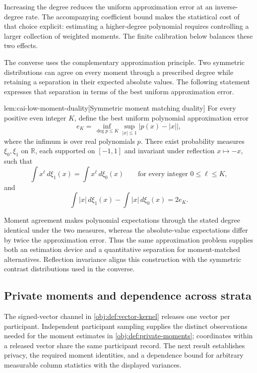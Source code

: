 \documentclass[11pt]{article}
\begin{document}
Increasing the degree reduces the uniform approximation error at an inverse-degree rate. The accompanying coefficient bound makes the statistical cost of that choice explicit: estimating a higher-degree polynomial requires controlling a larger collection of weighted moments. The finite calibration below balances these two effects.

The converse uses the complementary approximation principle. Two symmetric distributions can agree on every moment through a prescribed degree while retaining a separation in their expected absolute values. The following statement expresses that separation in terms of the best uniform approximation error.

\begin{theoremv}{lem:cai-low-moment-duality}[Symmetric moment matching duality]
For every positive even integer \(K\), define the best uniform polynomial approximation error
\[
e_K=\inf_{\deg p\le K}\sup_{|x|\le 1}\bigl|p(x)-|x|\bigr|,
\]
where the infimum is over real polynomials \(p\). There exist probability measures \(\xi_0,\xi_1\) on \(\mathbb R\), each supported on \([-1,1]\) and invariant under reflection \(x\mapsto -x\), such that
\[
\int x^\ell\,d\xi_1(x)=\int x^\ell\,d\xi_0(x)
\qquad\text{for every integer }0\le \ell\le K,
\]
and
\[
\int |x|\,d\xi_1(x)-\int |x|\,d\xi_0(x)=2e_K.
\]
\end{theoremv}

Moment agreement makes polynomial expectations through the stated degree identical under the two measures, whereas the absolute-value expectations differ by twice the approximation error. Thus the same approximation problem supplies both an estimation device and a quantitative separation for moment-matched alternatives. Reflection invariance aligns this construction with the symmetric contrast distributions used in the converse.

\subsection{Private moments and dependence across strata}

The signed-vector channel  in \cref{obj:def:vector-kernel} releases one vector per participant. Independent participant sampling supplies the distinct observations needed for the moment estimates in \cref{obj:def:private-moments}; coordinates within a released vector share the same participant record. The next result establishes privacy, the required moment identities, and a dependence bound for arbitrary measurable column statistics with the displayed variances.
\end{document}
